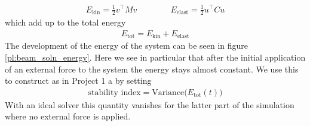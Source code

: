 \documentclass{report}
\newcounter{constant}
\begin{document}
\begin{align*}
	E_{\text{kin}} = \frac{1}{2}v^\top Mv
	\qquad\qquad E_{\text{elast}} = \frac{1}{2}u^\top Cu
\end{align*}
which add up to the total energy
\begin{align*}
	E_{\text{tot}}=E_{\text{kin}}+E_{\text{elast}}
\end{align*}
The development of the energy of the system can be seen in figure \ref{pl:beam_soln_energy}. Here we see in particular that after the initial application of an external force to the system the energy stays almost constant. We use this to construct as in Project 1 a  by setting
\begin{align*}
	\text{stability index}=\text{Variance}\big(E_{\text{tot}}(t)\big)
\end{align*}
With an ideal solver this quantity vanishes for the latter part of the simulation where no external force is applied.
\end{document}
